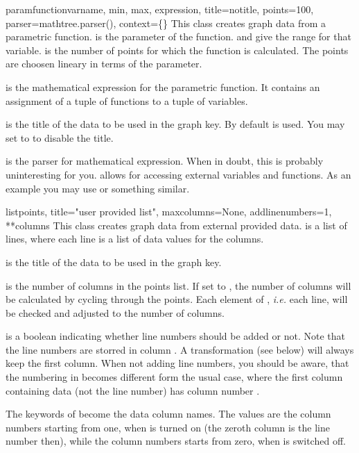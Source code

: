 \begin{classdesc}{paramfunction}{varname, min, max, expression,
                                 title=notitle, points=100,
                                 parser=mathtree.parser(),
                                 context=\{\}}
  This class creates graph data from a parametric function.
   is the parameter of the function.  and
   give the range for that variable.  is the
  number of points for which the function is calculated. The points
  are choosen lineary in terms of the parameter.

   is the mathematical expression for the parametric
  function. It contains an assignment of a tuple of functions to a
  tuple of variables.

   is the title of the data to be used in the graph key. By
  default  is used. You may set  to
   to disable the title.

   is the parser for mathematical expression. When in
  doubt, this is probably uninteresting for you.  allows
  for accessing external variables and functions. As an example you
  may use  or something similar.
\end{classdesc}

\begin{classdesc}{list}{points, title="user provided list",
                        maxcolumns=None, addlinenumbers=1, **columns}
  This class creates graph data from external provided data.
   is a list of lines, where each line is a list of data
  values for the columns.

   is the title of the data to be used in the graph key.

   is the number of columns in the points list. If set
  to , the number of columns will be calculated by cycling
  through the points. Each element of , \emph{i.e.} each
  line, will be checked and adjusted to the number of columns.

   is a boolean indicating whether line numbers
  should be added or not. Note that the line numbers are storred in
  column . A transformation (see  below) will
  always keep the first column. When not adding line numbers, you
  should be aware, that the numbering in  becomes
  different form the usual case, where the first column containing
  data (not the line number) has column number .

  The keywords of  become the data column names. The
  values are the column numbers starting from one, when
   is turned on (the zeroth column is the line
  number then), while the column numbers starts from zero, when
   is switched off.
\end{classdesc}

